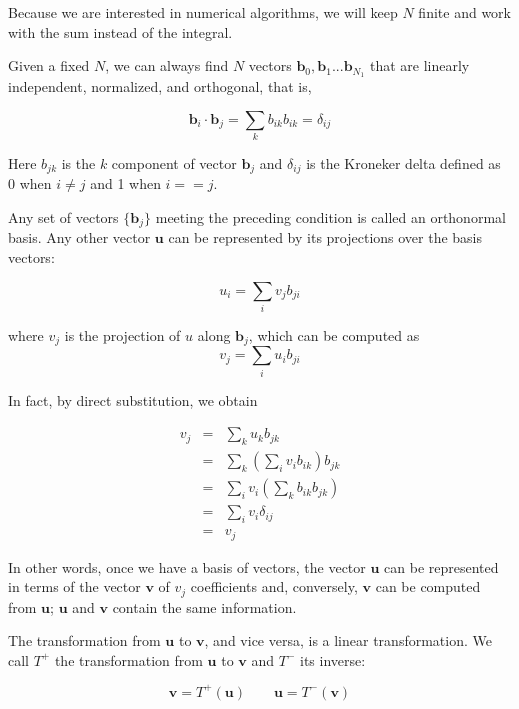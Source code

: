 \documentclass[justified, sixbynine]{tufte-book}
\theoremstyle{plain}%
\newtheorem * {corollary}{Corollary}
\theoremstyle{definition}
\theoremstyle{remark}
\newtheorem * {remark}{Remark}
\newtheorem * {note}{Note}
\begin{document}
\begin{fullwidth}
Because we are interested in numerical algorithms, we will keep $N$ finite and work with the sum instead of the integral.

Given a fixed $N$, we can always find $N$ vectors $\mathbf{b}_0, \mathbf{b}_1...\mathbf{b}_{N_1}$ that are linearly independent, normalized, and orthogonal, that is, 

\begin{equation}
\mathbf{b}_i \cdot \mathbf{b}_j = \sum_k b_{ik} b_{ik} = \delta_{ij}
\end{equation}

Here $b_{jk}$ is the $k$ component of vector $\mathbf{b}_j$ and $\delta_{ij}$ is the Kroneker delta defined as 0 when $i\neq j$ and 1 when $i == j$.

Any set of vectors $\{\mathbf{b}_j\}$ meeting the preceding condition is called an orthonormal basis. Any other vector $\mathbf{u}$ can be represented by its projections over the basis vectors:

\begin{equation}
  u_i = \sum_i v_j b_{ji}
\end{equation}

where $v_j$ is the projection of $u$ along $\mathbf{b}_j$, which can be computed as
\begin{equation}
  v_j = \sum_i u_i b_{ji}
\end{equation}

In fact, by direct substitution, we obtain

\begin{eqnarray}
  v_j &=& \sum_k u_k b_{jk} \\
      &=& \sum_k (\sum_i v_i b_{ik}) b_{jk} \\
      &=& \sum_i v_i (\sum_k b_{ik} b_{jk}) \\
      &=& \sum_i v_i \delta_{ij} \\
      &=& v_j
\end{eqnarray}

In other words, once we have a basis of vectors, the vector $\mathbf{u}$ can be represented in terms of the vector $\mathbf{v}$ of $v_j$ coefficients and, conversely, $\mathbf{v}$ can be computed from $\mathbf{u}$; $\mathbf{u}$ and $\mathbf{v}$ contain the same information.

The transformation from $\mathbf{u}$ to $\mathbf{v}$, and vice versa, is a linear transformation. We call $T^+$ the transformation from $\mathbf{u}$ to $\mathbf{v}$  and $T^-$ its inverse:

\begin{equation}
\mathbf{v} = T^+(\mathbf{u}) \qquad
\mathbf{u} = T^-(\mathbf{v})
\end{equation}


\end{fullwidth}
\end{document}
